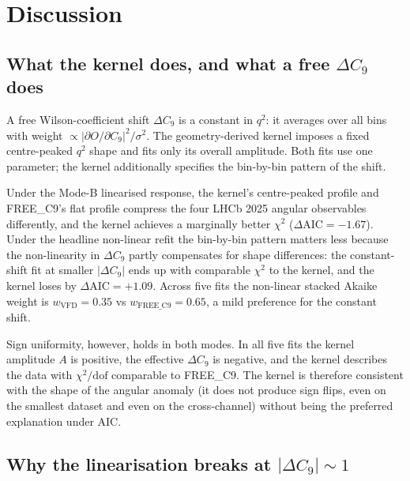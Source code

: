 \section{Discussion}\label{sec:discussion}

\subsection{What the kernel does, and what a free $\Delta C_{9}$ does}

A free Wilson-coefficient shift $\Delta C_{9}$ is a constant in
$q^{2}$: it averages over all bins with weight
$\propto |\partial O/\partial C_{9}|^{2}/\sigma^{2}$. The
geometry-derived kernel imposes a fixed centre-peaked $q^{2}$ shape
and fits only its overall amplitude. Both fits use one parameter; the
kernel additionally specifies the bin-by-bin pattern of the shift.

Under the Mode-B linearised response, the kernel's centre-peaked
profile and FREE\_C9's flat profile compress the four LHCb 2025
angular observables differently, and the kernel achieves a marginally
better $\chi^{2}$ ($\Delta\mathrm{AIC}=-1.67$). Under the headline
non-linear refit the bin-by-bin pattern matters less because the
non-linearity in $\Delta C_{9}$ partly compensates for shape
differences: the constant-shift fit at smaller $|\Delta C_{9}|$ ends
up with comparable $\chi^{2}$ to the kernel, and the kernel loses by
$\Delta\mathrm{AIC}=+1.09$. Across five fits the non-linear stacked
Akaike weight is $w_{\mathrm{VFD}}=0.35$ vs
$w_{\mathrm{FREE\_C9}}=0.65$, a mild preference for the constant
shift.

Sign uniformity, however, holds in both modes. In all five fits the
kernel amplitude $A$ is positive, the effective $\Delta C_{9}$ is
negative, and the kernel describes the data with $\chi^{2}/\mathrm{dof}$
comparable to FREE\_C9. The kernel is therefore consistent with the
shape of the angular anomaly (it does not produce sign flips, even on
the smallest dataset and even on the cross-channel) without being the
preferred explanation under AIC.

\subsection{Why the linearisation breaks at $|\Delta C_{9}|\sim 1$}

